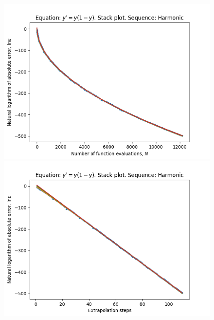 \begin{figure}[H]
\centering
\begin{minipage}{0.45\textwidth}
\centering
\includegraphics[scale=0.45]{../results/emr_plots/logistic_hp_harmonic_stack.png}
\end{minipage}
\begin{minipage}{0.45\textwidth}
\centering
\includegraphics[scale=0.45]{../results/emr_plots/logistic_hp_harmonic_steps_stack.png}
\end{minipage}
\end{figure}

